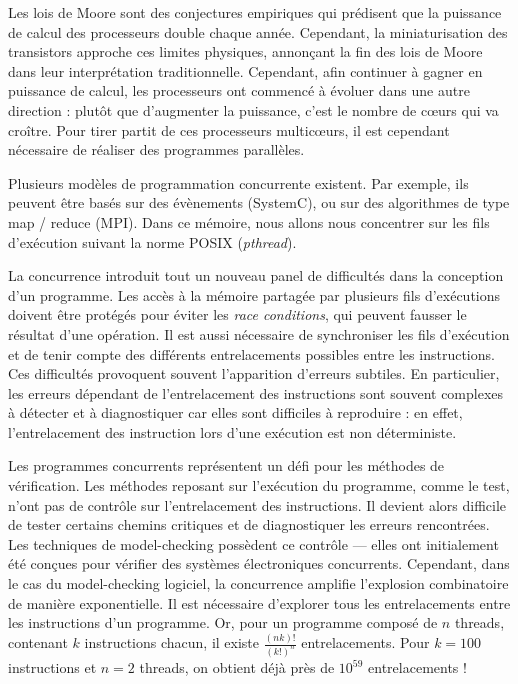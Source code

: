 Les lois de Moore sont des conjectures empiriques qui prédisent que la
puissance de calcul des processeurs double chaque année. Cependant, la
miniaturisation des transistors approche ces limites physiques,
annonçant la fin des lois de Moore dans leur interprétation
traditionnelle. Cependant, afin continuer à gagner en puissance de
calcul, les processeurs ont commencé à évoluer dans une autre direction
: plutôt que d'augmenter la puissance, c'est le nombre de cœurs qui va
croître. Pour tirer partit de ces processeurs multicœurs, il est
cependant nécessaire de réaliser des programmes parallèles.

Plusieurs modèles de programmation concurrente existent. Par exemple, ils
peuvent être basés sur des évènements (SystemC), ou sur des algorithmes
de type map / reduce (MPI). Dans ce mémoire, nous allons nous concentrer
sur les fils d'exécution suivant la norme POSIX (\emph{pthread}).

La concurrence introduit tout un nouveau panel de difficultés dans la conception
d'un programme. Les accès à la mémoire partagée par plusieurs fils d'exécutions
doivent être protégés pour éviter les \emph{race conditions}, qui peuvent
fausser le résultat d'une opération. Il est aussi nécessaire de synchroniser les
fils d'exécution et de tenir compte des différents entrelacements possibles
entre les instructions. Ces difficultés provoquent souvent l'apparition
d'erreurs subtiles. En particulier, les erreurs dépendant de l'entrelacement des
instructions sont souvent complexes à détecter et à diagnostiquer car elles sont
difficiles à reproduire : en effet, l'entrelacement des instruction lors d'une
exécution est non déterministe.

Les programmes concurrents représentent un défi pour les méthodes de
vérification. Les méthodes reposant sur l'exécution du programme, comme
le test, n'ont pas de contrôle sur l'entrelacement des instructions. Il
devient alors difficile de tester certains chemins critiques et de
diagnostiquer les erreurs rencontrées. Les techniques de model-checking
possèdent ce contrôle --- elles ont initialement été conçues pour vérifier
des systèmes électroniques concurrents. Cependant, dans le cas du
model-checking logiciel, la concurrence amplifie l'explosion
combinatoire de manière exponentielle. Il est nécessaire d'explorer tous
les entrelacements entre les instructions d'un programme. Or, pour un
programme composé de \(n\) threads, contenant \(k\) instructions chacun,
il existe \(\frac{(nk)!}{(k!)^n}\) entrelacements. Pour \(k = 100\)
instructions et \(n = 2\) threads, on obtient déjà près de \(10^{59}\)
entrelacements !

